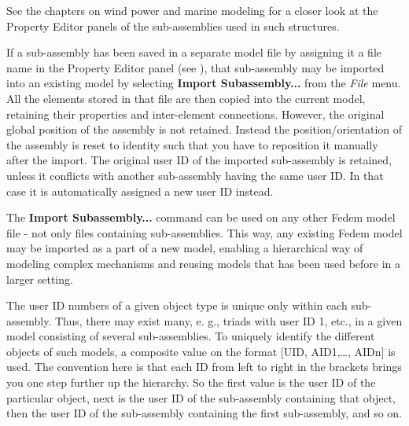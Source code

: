 See the chapters on wind power and marine modeling for a closer look at
the Property Editor panels of the sub-assemblies used in such structures.


If a sub-assembly has been saved in a separate model file by assigning
it a file name in the Property Editor panel (see
), that
sub-assembly may be imported into an existing model by selecting
\textbf{Import Subassembly...} from the {\sl File} menu. All the
elements stored in that file are then copied into the current model,
retaining their properties and inter-element connections. However, the
original global position of the assembly is not retained. Instead the
position/orientation of the assembly is reset to identity such that you
have to reposition it manually after the import. The original user ID of
the imported sub-assembly is retained, unless it conflicts with another
sub-assembly having the same user ID.
In that case it is automatically assigned a new user ID instead.


The \textbf{Import Subassembly...} command can be used on any other
Fedem model file - not only files containing sub-assemblies. This way,
any existing Fedem model may be imported as a part of a new model,
enabling a hierarchical way of modeling complex mechanisms and reusing
models that has been used before in a larger setting.




The user ID numbers of a given object type is unique only within each
sub-assembly. Thus, there may exist many, e. g., triads with user ID 1,
etc., in a given model consisting of several sub-assemblies. To uniquely
identify the different objects of such models, a composite value on the
format {[}UID, AID1,\ldots, AIDn{]} is used. The convention here is that
each ID from left to right in the brackets brings you one step further
up the hierarchy. So the first value is the user ID of the particular
object, next is the user ID of the sub-assembly containing that object,
then the user ID of the sub-assembly containing the first sub-assembly,
and so on.

